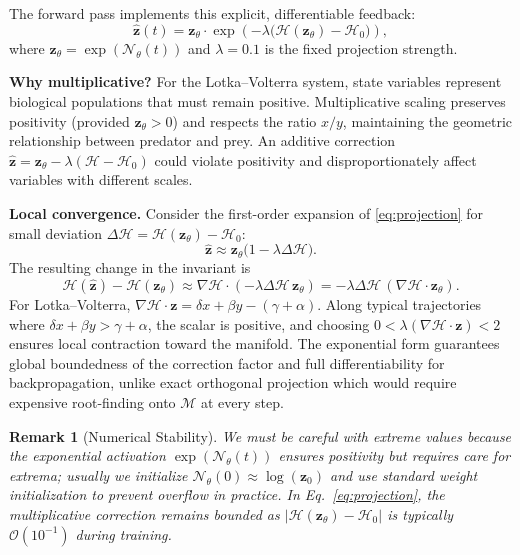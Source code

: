 \documentclass[pdflatex,sn-mathphys-num]{sn-jnl}
\theoremstyle{thmstyleone}%
\theoremstyle{thmstyletwo}%
\newtheorem{remark}{Remark}%
\theoremstyle{thmstylethree}%
\begin{document}
	The forward pass implements this explicit, differentiable feedback:
	\begin{equation}
	\hat{\mathbf{z}}(t) = \mathbf{z}_\theta \cdot 
	\exp\!\left(-\lambda\big(\mathcal{H}(\mathbf{z}_\theta)-\mathcal{H}_0\big)\right),
	\label{eq:projection}
	\end{equation}
	where $\mathbf{z}_\theta = \exp(\mathcal{N}_\theta(t))$ and $\lambda = 0.1$ is the fixed projection strength. 
	
	\textbf{Why multiplicative?} For the Lotka--Volterra system, state variables represent biological populations that must remain positive. Multiplicative scaling preserves positivity (provided $\mathbf{z}_\theta > 0$) and respects the ratio $x/y$, maintaining the geometric relationship between predator and prey. An additive correction $\hat{\mathbf{z}} = \mathbf{z}_\theta - \lambda(\mathcal{H} - \mathcal{H}_0)$ could violate positivity and disproportionately affect variables with different scales.
	
	\textbf{Local convergence.} Consider the first-order expansion of \eqref{eq:projection} for small deviation $\Delta \mathcal{H} = \mathcal{H}(\mathbf{z}_\theta) - \mathcal{H}_0$:
	\begin{equation}
	\hat{\mathbf{z}} \approx \mathbf{z}_\theta \bigl(1 - \lambda \Delta \mathcal{H}\bigr).
	\end{equation}
	The resulting change in the invariant is
	\begin{equation}
	\mathcal{H}(\hat{\mathbf{z}}) - \mathcal{H}(\mathbf{z}_\theta) \approx \nabla \mathcal{H} \cdot (-\lambda \Delta \mathcal{H}\, \mathbf{z}_\theta) = -\lambda \Delta \mathcal{H} \, (\nabla \mathcal{H} \cdot \mathbf{z}_\theta).
	\end{equation}
	For Lotka--Volterra, $\nabla \mathcal{H} \cdot \mathbf{z} = \delta x + \beta y - (\gamma + \alpha)$. Along typical trajectories where $\delta x + \beta y > \gamma + \alpha$, the scalar is positive, and choosing $0 < \lambda (\nabla \mathcal{H} \cdot \mathbf{z}) < 2$ ensures local contraction toward the manifold. The exponential form guarantees global boundedness of the correction factor and full differentiability for backpropagation, unlike exact orthogonal projection which would require expensive root-finding onto $\mathcal{M}$ at every step.
	
	\begin{remark}[Numerical Stability]
		We must be careful with extreme values because the exponential activation $\exp(\mathcal{N}_\theta(t))$ ensures positivity but requires care for extrema; usually we initialize $\mathcal{N}_\theta(0) \approx \log(\mathbf{z}_0)$ and use standard weight initialization to prevent overflow in practice. In Eq.~\eqref{eq:projection}, the multiplicative correction remains bounded as $|\mathcal{H}(\mathbf{z}_\theta) - \mathcal{H}_0|$ is typically $\mathcal{O}(10^{-1})$ during training.
	\end{remark}
	
\end{document}
